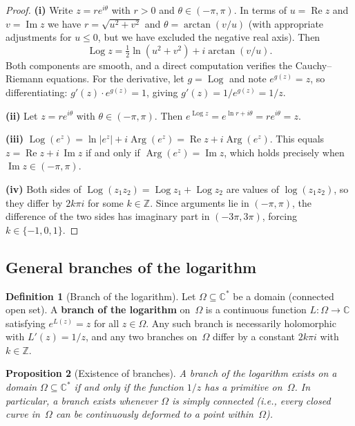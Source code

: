 \documentclass[12pt,a4paper,openany]{book}
\theoremstyle{definition}
\newtheorem{definition}{Definition}[chapter]
\theoremstyle{plain}
\newtheorem{proposition}[definition]{Proposition}
\theoremstyle{remark}
\newcommand{\C}{\mathbb{C}}
\newcommand{\Z}{\mathbb{Z}}
\DeclareMathOperator{\re}{Re}
\DeclareMathOperator{\im}{Im}
\DeclareMathOperator{\Arg}{Arg}
\DeclareMathOperator{\Log}{Log}
\newcommand{\abs}[1]{\left|#1\right|}
\begin{document}
\begin{proof}
\textbf{(i)} Write $z = re^{i\theta}$ with $r>0$ and $\theta\in(-\pi,\pi)$.
In terms of $u = \re z$ and $v = \im z$ we have $r = \sqrt{u^2+v^2}$ and
$\theta = \arctan(v/u)$ (with appropriate adjustments for $u\le 0$, but we
have excluded the negative real axis).  Then
\[
  \Log z = \tfrac{1}{2}\ln(u^2+v^2) + i\arctan(v/u).
\]
Both components are smooth, and a direct computation verifies the Cauchy--Riemann
equations.  For the derivative, let $g = \Log$ and note
$e^{g(z)} = z$, so differentiating: $g'(z)\cdot e^{g(z)} = 1$, giving
$g'(z) = 1/e^{g(z)} = 1/z$.

\textbf{(ii)} Let $z = re^{i\theta}$ with $\theta\in(-\pi,\pi)$.
Then $e^{\Log z} = e^{\ln r + i\theta} = re^{i\theta} = z$.

\textbf{(iii)} $\Log(e^z) = \ln\abs{e^z}+i\Arg(e^z) = \re z + i\Arg(e^z)$.
This equals $z = \re z + i\,\im z$ if and only if $\Arg(e^z) = \im z$, which
holds precisely when $\im z \in (-\pi,\pi)$.

\textbf{(iv)} Both sides of $\Log(z_1 z_2) = \Log z_1 + \Log z_2$ are values
of $\log(z_1 z_2)$, so they differ by $2k\pi i$ for some $k\in\Z$.
Since arguments lie in $(-\pi,\pi)$, the difference of the two sides has
imaginary part in $(-3\pi,3\pi)$, forcing $k\in\{-1,0,1\}$.
\end{proof}

\subsection{General branches of the logarithm}

\begin{definition}[Branch of the logarithm]\label{def:log-branch}
Let $\Omega\subseteq\C^*$ be a domain (connected open set).  A
\textbf{branch of the logarithm} on~$\Omega$ is a
continuous function $L\colon\Omega\to\C$ satisfying $e^{L(z)}=z$ for all
$z\in\Omega$.  Any such branch is necessarily holomorphic with
$L'(z)=1/z$, and any two branches on~$\Omega$ differ by a constant
$2k\pi i$ with $k\in\Z$.
\end{definition}

\begin{proposition}[Existence of branches]\label{prop:log-branch-existence}
A branch of the logarithm exists on a domain $\Omega\subseteq\C^*$ if and
only if the function $1/z$ has a primitive on~$\Omega$.  In particular, a branch
exists whenever $\Omega$ is \emph{simply connected} (i.e., every closed curve
in~$\Omega$ can be continuously deformed to a point within~$\Omega$).
\end{proposition}
\end{document}
